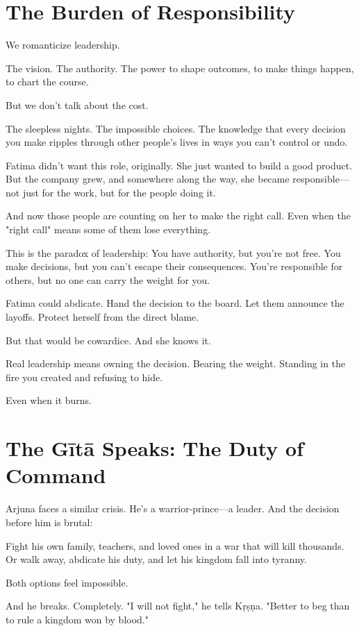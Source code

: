 \documentclass[11pt,twoside]{book}
\begin{document}
\section*{The Burden of Responsibility}

We romanticize leadership.

The vision. The authority. The power to shape outcomes, to make things happen, to chart the course.

But we don't talk about the cost.

The sleepless nights. The impossible choices. The knowledge that every decision you make ripples through other people's lives in ways you can't control or undo.

Fatima didn't want this role, originally. She just wanted to build a good product. But the company grew, and somewhere along the way, she became responsible—not just for the work, but for the people doing it.

And now those people are counting on her to make the right call. Even when the "right call" means some of them lose everything.

This is the paradox of leadership: You have authority, but you're not free. You make decisions, but you can't escape their consequences. You're responsible for others, but no one can carry the weight for you.

Fatima could abdicate. Hand the decision to the board. Let them announce the layoffs. Protect herself from the direct blame.

But that would be cowardice. And she knows it.

Real leadership means owning the decision. Bearing the weight. Standing in the fire you created and refusing to hide.

Even when it burns.

\section*{The Gītā Speaks: The Duty of Command}

Arjuna faces a similar crisis. He's a warrior-prince—a leader. And the decision before him is brutal:

Fight his own family, teachers, and loved ones in a war that will kill thousands. Or walk away, abdicate his duty, and let his kingdom fall into tyranny.

Both options feel impossible.

And he breaks. Completely. "I will not fight," he tells Kṛṣṇa. "Better to beg than to rule a kingdom won by blood."
\end{document}
